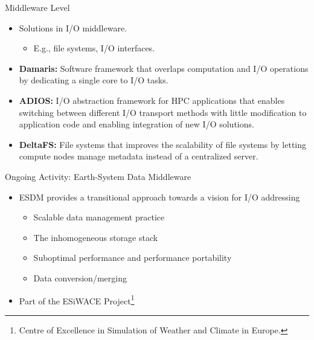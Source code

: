 \documentclass[compress,11pt,xcolor=svgnames,aspectratio=169]{beamer}
\begin{document}
\begin{frame}[fragile]{Middleware Level}

\begin{itemize}
\setlength\itemsep{0.4cm}

\item Solutions in I/O middleware.

    \begin{itemize}

    \item E.g., file systems, I/O interfaces.

    \end{itemize}

\item \textbf{Damaris:} Software framework that overlaps computation and I/O operations by dedicating a single core to I/O tasks.

\item \textbf{ADIOS:} I/O abstraction framework for HPC applications that enables switching between different I/O transport methods with little modification to application code and enabling integration of new I/O solutions.

\item \textbf{DeltaFS:} File systems that improves the scalability of file systems by letting compute nodes manage metadata instead of a centralized server.

\end{itemize}

\nocite{3372390}

\end{frame}

\begin{frame}[fragile]{Ongoing Activity: Earth-System Data Middleware}

\begin{itemize}
\setlength\itemsep{0.4cm}

    \item ESDM provides a transitional approach towards a vision for I/O addressing\\[0.3cm]

    \begin{itemize}
    \setlength\itemsep{0.4cm}
    \item Scalable data management practice
    \item The inhomogeneous storage stack
    \item Suboptimal performance and performance portability
    \item Data conversion/merging

    \end{itemize}

    \item Part of the ESiWACE Project\footnote{Centre of Excellence in Simulation of Weather and Climate in Europe.}

\end{itemize}

\end{frame}
\end{document}
